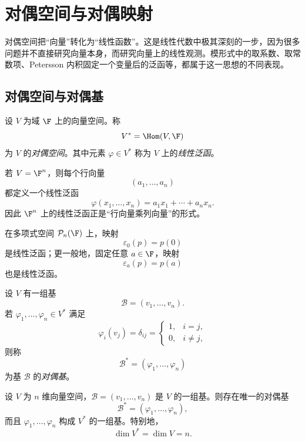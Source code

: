 \section{对偶空间与对偶映射}

对偶空间把“向量”转化为“线性函数”。这是线性代数中极其深刻的一步，因为很多问题并不直接研究向量本身，而研究向量上的线性观测。模形式中的取系数、取常数项、Petersson 内积固定一个变量后的泛函等，都属于这一思想的不同表现。

\subsection{对偶空间与对偶基}

\begin{definition}
设 $V$ 为域 $\F$ 上的向量空间。称
\[
  V^*=\Hom(V,\F)
\]
为 $V$ 的\emph{对偶空间}。其中元素 $\varphi\in V^*$ 称为 $V$ 上的\emph{线性泛函}。
\end{definition}

\begin{example}
若 $V=\F^n$，则每个行向量
\[
  (a_1,\dots,a_n)
\]
都定义一个线性泛函
\[
  \varphi(x_1,\dots,x_n)=a_1x_1+\cdots+a_nx_n.
\]
因此 $\F^n$ 上的线性泛函正是“行向量乘列向量”的形式。
\end{example}

\begin{example}
在多项式空间 $\mathcal P_n(\F)$ 上，映射
\[
  \varepsilon_0(p)=p(0)
\]
是线性泛函；更一般地，固定任意 $a\in\F$，映射
\[
  \varepsilon_a(p)=p(a)
\]
也是线性泛函。
\end{example}

\begin{definition}
设 $V$ 有一组基
\[
  \mathcal B=(v_1,\dots,v_n).
\]
若 $\varphi_1,\dots,\varphi_n\in V^*$ 满足
\[
  \varphi_i(v_j)=\delta_{ij}
  =\begin{cases}
    1,& i=j,\\
    0,& i\neq j,
  \end{cases}
\]
则称
\[
  \mathcal B^*=(\varphi_1,\dots,\varphi_n)
\]
为基 $\mathcal B$ 的\emph{对偶基}。
\end{definition}

\begin{theorem}
设 $V$ 为 $n$ 维向量空间，$\mathcal B=(v_1,\dots,v_n)$ 是 $V$ 的一组基。则存在唯一的对偶基
\[
  \mathcal B^*=(\varphi_1,\dots,\varphi_n),
\]
而且 $\varphi_1,\dots,\varphi_n$ 构成 $V^*$ 的一组基。特别地，
\[
  \dim V^*=\dim V=n.
\]
\end{theorem}

